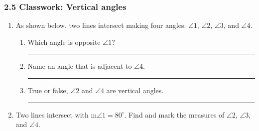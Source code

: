\documentclass[12pt, twoside]{article}
\begin{document}
\subsubsection*{2.5 Classwork: Vertical angles} %
\begin{enumerate}
  \item As shown below, two lines intersect making four angles: $\angle 1$, $\angle 2$, $\angle 3$, and $\angle 4$.
  \begin{center}
  \end{center}
  \begin{enumerate}
    \item Which angle is opposite $\angle 1$? \rule{4cm}{0.15mm} \bigskip
    \item Name an angle that is adjacent to $\angle 4$. \rule{4cm}{0.15mm} \bigskip
    \item True or false, $\angle 2$ and $\angle 4$ are vertical angles. \rule{3cm}{0.15mm}
  \end{enumerate}

\item Two lines intersect with m$\angle 1=80^\circ$. Find and mark the measures of $\angle 2$, $\angle 3$, and $\angle 4$.
  \begin{flushleft}
  \end{flushleft}


\end{enumerate}
\end{document}

